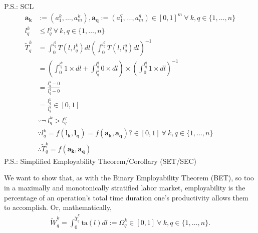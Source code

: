 \documentclass[hidelinks, nonatbib]{elsarticle}
\begin{document}
    P.S.: SCL
    \begin{align}
        \boldsymbol{a_k}
        &:= (a_{1}^{k}, \dots, a_{m}^{k})
        ,
        \boldsymbol{a_q}
        := (a_{1}^{q}, \dots, a_{m}^{q})
        \in [0,1]^{m}
        \
        \forall
        \
        k,q \in \{1, \dots, n\}
        \\
        l_{q}^{k}
        &\leq 
        l_{q}^{q}
        \
        \forall
        \
        k,q \in \{1, \dots, n\}
        \\
        \tilde{T}_{q}^{k}
        &= 
        \int_{0}^{l_{q}^{q}}{
            T(l,l_{q}^{k})
            dl
        }
        \left(
            \int_{0}^{l_{q}^{q}}{
                T(l,l_{q}^{q})
                dl
            }
        \right) ^ {-1}
        \\
        &= 
        \left(
            \int_{0}^{l_{q}^{k}}{
                1
                \times
                dl
            }
            +
            \int_{l_{q}^{k}}^{l_{q}^{q}}{
                0
                \times
                dl
            }
        \right)
        \times
        \left(
            \int_{0}^{l_{q}^{q}}{
                1
                \times
                dl
            }
        \right) ^ {-1}
        \\
        &= 
        \frac{l_{q}^{k} - 0}{l_{q}^{q} - 0}
        \\
        &= 
        \frac{l_{q}^{k}}{l_{q}^{q}}
        \in [0,1]
        \\
        &\because
        \neg
        \
        l_{q}^{k}
        >
        l_{q}^{q}
        \\
        &\because
        l_{q}^{k} = 
        f(
            \boldsymbol{l_k},
            \boldsymbol{l_q}
        ) 
        =
        f(
            \boldsymbol{a_k},
            \boldsymbol{a_q}
        )?
        \in [0,1]
        \
        \forall
        \
        k,q \in \{1, \dots, n\}
        \\
        &\therefore
        \tilde{T}_{q}^{k}
        =
        f(
            \boldsymbol{a_k},
            \boldsymbol{a_q}
        )
    \end{align}
    P.S.: Simplified Employability Theorem/Corollary (SET/SEC)

    We want to show that, as with the Binary Employability Theorem (BET), so too in a maximally and monotonically stratified labor market, employability is the percentage of an operation's total time duration one's productivity allows them to accomplish. Or, mathematically,
    \begin{gather}
        \tilde{W}_{q}^{k}
        =
        \int_{0}^{\tilde{T}_{q}^{k}}
        \text{ta}(l)
        dl
        :=
        \Omega_{q}^{k}
        \in 
        [0,1]
        \
        \forall
        \
        k,q \in \{1, \dots, n\}
        .
    \end{gather}
\end{document}
